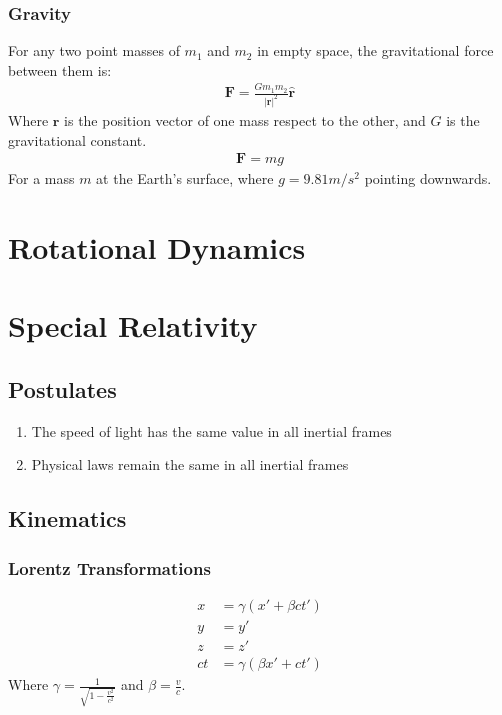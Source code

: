 \documentclass[11pt]{article}
\newcommand{\ve}[1]{\ensuremath{\boldsymbol{#1}}}
\begin{document}
\begin{multicols*}{3}
\subsubsection*{Gravity}
For any two point masses of $m_1$ and $m_2$ in empty space, the gravitational force between them is:
	\begin{align*}
	\ve{F}=\frac{Gm_1m_2}{|\ve{r}|^2}\hat{\ve{r}}
	\end{align*}
Where $\ve{r}$ is the position vector of one mass respect to the other, and $G$ is the gravitational constant.
	\begin{align*}
	\ve{F}=mg
	\end{align*}
\noindent For a mass $m$ at the Earth's surface, where $g=9.81m/s^2$ pointing downwards.
\section{Rotational Dynamics}
\section{Special Relativity}
\subsection{Postulates}
\begin{enumerate}
\item The speed of light has the same value in all inertial frames
\item Physical laws remain the same in all inertial frames
\end{enumerate}
\subsection{Kinematics}
\subsubsection*{Lorentz Transformations}
	\begin{align*}
	x&= \gamma (x' + \beta ct') \\
	y&=y' \\
	z&=z' \\
	ct&= \gamma (\beta x' + ct')
	\end{align*}
Where $\gamma = \frac{1}{\sqrt{1-\frac{v^2}{c^2}}}$ and $\beta = \frac{v}{c}$.

\end{multicols*}
\end{document}
